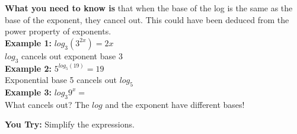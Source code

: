 \documentclass[12pt]{article}
\begin{document}
\pagebreak

\textbf{What you need to know is} that when the base of the log is the same as the base of the exponent, they cancel out. This could have been deduced from the power property of exponents.\\

\textbf{Example 1:} $log_{3}\left(3^{2x} \right) = 2x$\\

\hspace{.75in} $log_{3}$ cancels out exponent base $3$\\

\textbf{Example 2:} $5^{log_{5}(19)}= 19$\\

\hspace{.75in} Exponential base 5 cancels out $log_{5}$\\

\textbf{Example 3:} $log_{3}9^{x}= $\\

\hspace{.75in} What cancels out? The $log$ and the exponent have different bases!\\

\hrulefill

\textbf{You Try:} Simplify the expressions.\\
\end{document}
